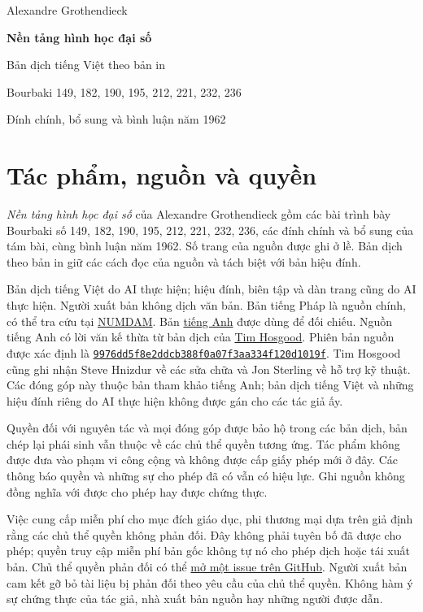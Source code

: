 \documentclass[11pt,twoside,openany]{book}
\numberwithin{equation}{section}
\newcommand{\editiondescription}{Bản dịch theo bản in giữ các cách đọc của nguồn và tách biệt với bản hiệu đính.}
\begin{document}
\frontmatter
\begin{titlepage}
\centering\vspace*{2cm}
{\Large Alexandre Grothendieck\par}\vspace{1.5cm}
{\Huge\bfseries Nền tảng hình học đại số\par}\vspace{1.2cm}
{\Large Bản dịch tiếng Việt theo bản in\par}
\vfill
{Bourbaki 149, 182, 190, 195, 212, 221, 232, 236\par}
{Đính chính, bổ sung và bình luận năm 1962\par}
\end{titlepage}
\chapter*{Tác phẩm, nguồn và quyền}
\textit{Nền tảng hình học đại số} của Alexandre Grothendieck gồm các bài trình bày
Bourbaki số 149, 182, 190, 195, 212, 221, 232, 236, các đính chính và bổ sung
của tám bài, cùng bình luận năm 1962. Số trang của nguồn được ghi ở lề.
\editiondescription

Bản dịch tiếng Việt do AI thực hiện; hiệu đính, biên tập và dàn trang cũng do AI
thực hiện. Người xuất bản không dịch văn bản. Bản tiếng Pháp là nguồn chính,
có thể tra cứu tại \href{https://www.numdam.org/}{NUMDAM}. Bản
\href{https://github.com/KokunoYumeto/fga-en}{tiếng Anh} được dùng để đối chiếu.
Nguồn tiếng Anh có lời văn kế thừa từ bản dịch của \href{https://github.com/thosgood/fga}{Tim Hosgood}.
Phiên bản nguồn được xác định là
\href{https://github.com/thosgood/fga/tree/9976dd5f8e2ddcb388f0a07f3aa334f120d1019f}{\nolinkurl{9976dd5f8e2ddcb388f0a07f3aa334f120d1019f}}.
Tim Hosgood cũng ghi nhận Steve Hnizdur về các sửa chữa và Jon Sterling về hỗ trợ kỹ thuật.
Các đóng góp này thuộc bản tham khảo tiếng Anh; bản dịch tiếng Việt và những
hiệu đính riêng do AI thực hiện không được gán cho các tác giả ấy.

Quyền đối với nguyên tác và mọi đóng góp được bảo hộ trong các bản dịch, bản
chép lại phái sinh vẫn thuộc về các chủ thể quyền tương ứng. Tác phẩm không được
đưa vào phạm vi công cộng và không được cấp giấy phép mới ở đây. Các thông báo
quyền và những sự cho phép đã có vẫn có hiệu lực. Ghi nguồn không đồng nghĩa với
được cho phép hay được chứng thực.

Việc cung cấp miễn phí cho mục đích giáo dục, phi thương mại dựa trên giả định
rằng các chủ thể quyền không phản đối. Đây không phải tuyên bố đã được cho phép;
quyền truy cập miễn phí bản gốc không tự nó cho phép dịch hoặc tái xuất bản.
Chủ thể quyền phản đối có thể \href{https://github.com/KokunoYumeto/ega-fga-sga-vi/issues}{mở một issue trên GitHub}.
Người xuất bản cam kết gỡ bỏ tài liệu bị phản đối theo yêu cầu của chủ thể quyền.
Không hàm ý sự chứng thực của tác giả, nhà xuất bản nguồn hay những người được dẫn.
\clearpage
\end{document}
